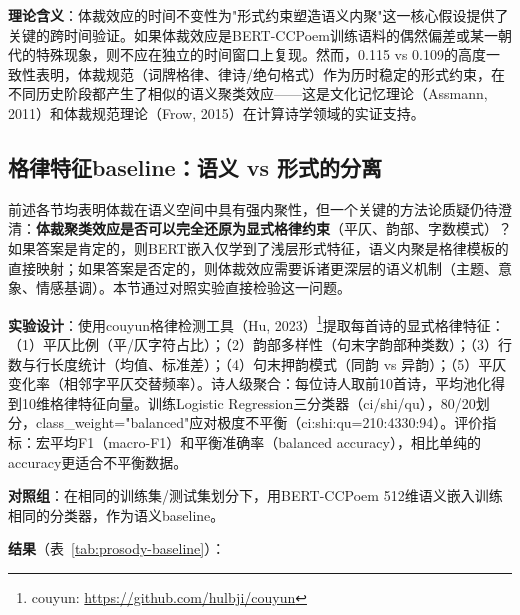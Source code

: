 \textbf{理论含义}：体裁效应的时间不变性为"形式约束塑造语义内聚"这一核心假设提供了关键的跨时间验证。如果体裁效应是BERT-CCPoem训练语料的偶然偏差或某一朝代的特殊现象，则不应在独立的时间窗口上复现。然而，0.115 vs 0.109的高度一致性表明，体裁规范（词牌格律、律诗/绝句格式）作为历时稳定的形式约束，在不同历史阶段都产生了相似的语义聚类效应——这是文化记忆理论（Assmann, 2011）和体裁规范理论（Frow, 2015）在计算诗学领域的实证支持。

\subsection{格律特征baseline：语义 vs 形式的分离}
\label{sec:prosody-baseline}

前述各节均表明体裁在语义空间中具有强内聚性，但一个关键的方法论质疑仍待澄清：\textbf{体裁聚类效应是否可以完全还原为显式格律约束}（平仄、韵部、字数模式）？如果答案是肯定的，则BERT嵌入仅学到了浅层形式特征，语义内聚是格律模板的直接映射；如果答案是否定的，则体裁效应需要诉诸更深层的语义机制（主题、意象、情感基调）。本节通过对照实验直接检验这一问题。

\textbf{实验设计}：使用couyun格律检测工具（Hu, 2023）\footnote{couyun: \url{https://github.com/hulbji/couyun}}提取每首诗的显式格律特征：（1）平仄比例（平/仄字符占比）；（2）韵部多样性（句末字韵部种类数）；（3）行数与行长度统计（均值、标准差）；（4）句末押韵模式（同韵 vs 异韵）；（5）平仄变化率（相邻字平仄交替频率）。诗人级聚合：每位诗人取前10首诗，平均池化得到10维格律特征向量。训练Logistic Regression三分类器（ci/shi/qu），80/20划分，class\_weight="balanced"应对极度不平衡（ci:shi:qu=210:4330:94）。评价指标：宏平均F1（macro-F1）和平衡准确率（balanced accuracy），相比单纯的accuracy更适合不平衡数据。

\textbf{对照组}：在相同的训练集/测试集划分下，用BERT-CCPoem 512维语义嵌入训练相同的分类器，作为语义baseline。

\textbf{结果}（表~\ref{tab:prosody-baseline}）：

